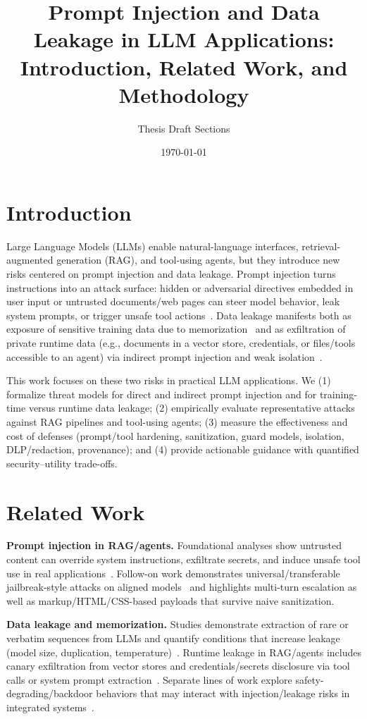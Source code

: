 \documentclass[11pt]{article}
\title{Prompt Injection and Data Leakage in LLM Applications: Introduction, Related Work, and Methodology}
\author{Thesis Draft Sections}
\date{\today}
\begin{document}
\maketitle

\section{Introduction}
Large Language Models (LLMs) enable natural-language interfaces, retrieval-augmented generation (RAG), and tool-using agents, but they introduce new risks centered on prompt injection and data leakage. Prompt injection turns instructions into an attack surface: hidden or adversarial directives embedded in user input or untrusted documents/web pages can steer model behavior, leak system prompts, or trigger unsafe tool actions~\cite{greshake2023prompt,zou2023universal}. Data leakage manifests both as exposure of sensitive training data due to memorization~\cite{carlini2021extracting,carlini2022quantifying} and as exfiltration of private runtime data (e.g., documents in a vector store, credentials, or files/tools accessible to an agent) via indirect prompt injection and weak isolation~\cite{greshake2023prompt}.

This work focuses on these two risks in practical LLM applications. We (1) formalize threat models for direct and indirect prompt injection and for training-time versus runtime data leakage; (2) empirically evaluate representative attacks against RAG pipelines and tool-using agents; (3) measure the effectiveness and cost of defenses (prompt/tool hardening, sanitization, guard models, isolation, DLP/redaction, provenance); and (4) provide actionable guidance with quantified security--utility trade-offs.

\section{Related Work}
\textbf{Prompt injection in RAG/agents.} Foundational analyses show untrusted content can override system instructions, exfiltrate secrets, and induce unsafe tool use in real applications~\cite{greshake2023prompt}. Follow-on work demonstrates universal/transferable jailbreak-style attacks on aligned models~\cite{zou2023universal} and highlights multi-turn escalation as well as markup/HTML/CSS-based payloads that survive naive sanitization.

\textbf{Data leakage and memorization.} Studies demonstrate extraction of rare or verbatim sequences from LLMs and quantify conditions that increase leakage (model size, duplication, temperature)~\cite{carlini2021extracting,carlini2022quantifying}. Runtime leakage in RAG/agents includes canary exfiltration from vector stores and credentials/secrets disclosure via tool calls or system prompt extraction~\cite{greshake2023prompt}. Separate lines of work explore safety-degrading/backdoor behaviors that may interact with injection/leakage risks in integrated systems~\cite{anthropic2024sleeper}.
\end{document}
